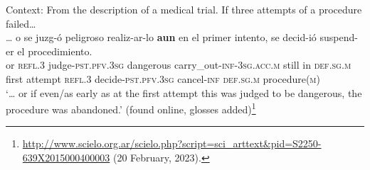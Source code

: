 \begin{exe}
	\ex Context: From the description of a medical trial. If three attempts of a procedure failed…\label{appendixSpanishAunTimeScalar3}\\
	\gll … o se juzg-ó peligroso realiz-ar-lo \textbf{aun} en el primer intento, se decid-ió suspend-er el procedimiento.\\
	{} or \textsc{refl}.3 judge-\textsc{pst}.\textsc{pfv}.3\textsc{sg} dangerous carry\_out-\textsc{inf}-\textsc{3}\textsc{sg}.\textsc{acc}.\textsc{m} still in \textsc{def}.\textsc{sg}.\textsc{m} first attempt \textsc{refl}.3 decide-\textsc{pst}.\textsc{pfv}.3\textsc{sg} cancel-\textsc{inf} \textsc{def}.\textsc{sg}.\textsc{m} procedure(\textsc{m)}\\
	\glt \lq … or if even/as early as at the first attempt this was judged to be dangerous, the procedure was abandoned.\rq{ }(found online, glosses added)\footnote{\url{http://www.scielo.org.ar/scielo.php?script=sci_arttext&pid=S2250-639X2015000400003} (20 February, 2023).}
\end{exe}

